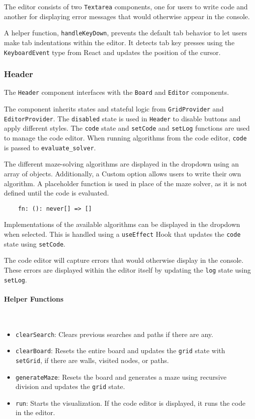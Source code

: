 The editor consists of two \texttt{Textarea} components, one for users to write code and another for displaying error messages that would otherwise appear in the console.

A helper function, \texttt{handleKeyDown}, prevents the default tab behavior to let users make tab indentations within the editor. It detects tab key presses using the \texttt{KeyboardEvent} type from React and updates the position of the cursor.

\subsubsection{Header}
The \texttt{Header} component interfaces with the \texttt{Board} and \texttt{Editor} components.

The component inherits states and stateful logic from \texttt{GridProvider} and \texttt{EditorProvider}. The \texttt{disabled} state is used in \texttt{Header} to disable buttons and apply different styles. The \texttt{code} state and \texttt{setCode} and \texttt{setLog} functions are used to manage the code editor. When running algorithms from the code editor, \texttt{code} is passed to \texttt{evaluate\_solver}.

The different maze-solving algorithms are displayed in the dropdown using an array of objects. Additionally, a Custom option allows users to write their own algorithm. A placeholder function is used in place of the maze solver, as it is not defined until the code is evaluated.

\begin{verbatim}
    fn: (): never[] => []
\end{verbatim}


Implementations of the available algorithms can be displayed in the dropdown when selected. This is handled using a \texttt{useEffect} Hook that updates the \texttt{code} state using \texttt{setCode}.

The code editor will capture errors that would otherwise display in the console. These errors are displayed within the editor itself by updating the \texttt{log} state using \texttt{setLog}.

\paragraph{Helper Functions} \

\begin{itemize}
    \item \texttt{clearSearch}: Clears previous searches and paths if there are any.
    \item \texttt{clearBoard}: Resets the entire board and updates the \texttt{grid} state with \texttt{setGrid}, if there are walls, visited nodes, or paths.
    \item \texttt{generateMaze}: Resets the board and generates a maze using recursive division and updates the \texttt{grid} state.
    \item \texttt{run}: Starts the visualization. If the code editor is displayed, it runs the code in the editor.
\end{itemize}

